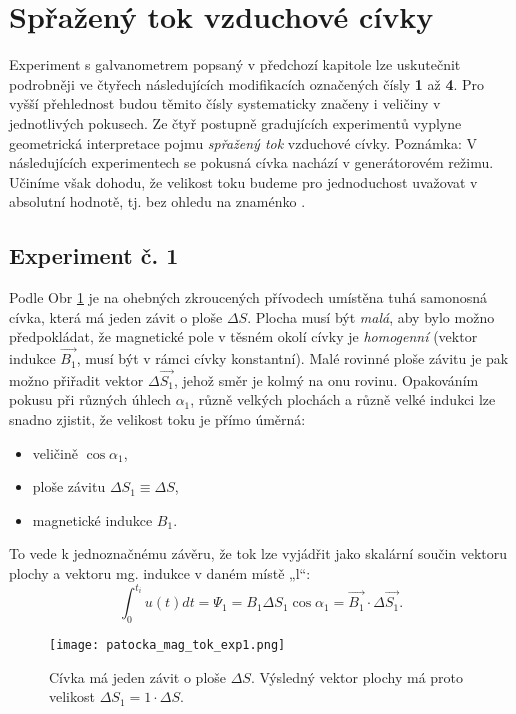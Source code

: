     \section{Spřažený tok vzduchové cívky}\label{ES:sec02}
      Experiment s galvanometrem popsaný v předchozí kapitole lze uskutečnit podrobněji ve čtyřech
      následujících modifikacích označených čísly \textbf{1} až \textbf{4}. Pro vyšší přehlednost
      budou těmito čísly systematicky značeny i veličiny v jednotlivých pokusech. Ze čtyř postupně
      gradujících experimentů vyplyne geometrická interpretace pojmu \emph{spřažený tok} vzduchové
      cívky. Poznámka: V následujících experimentech se pokusná  cívka nachází v generátorovém
      režimu. Učiníme však dohodu, že velikost toku budeme pro jednoduchost uvažovat v absolutní
      hodnotě, tj. bez ohledu na znaménko \cite[s.~12]{Patocka4}.

      \subsection{Experiment č. 1}
        Podle Obr \ref{es:fig_patocka_mag_tok_exp1} je na ohebných zkroucených přívodech umístěna 
        tuhá samonosná cívka, která má jeden závit o ploše \(\Delta S\). Plocha musí být 
        \emph{malá}, aby bylo možno předpokládat, že magnetické pole v těsném okolí cívky je 
        \emph{homogenní} (vektor indukce \(\vec{B_1}\), musí být v rámci cívky konstantní). Malé 
        rovinné ploše závitu je pak možno přiřadit vektor \(\Delta\vec{S_1}\), jehož směr je kolmý 
        na onu rovinu. Opakováním pokusu při různých úhlech \(\alpha_1\), různě velkých plochách a 
        různě velké indukci lze snadno zjistit, že velikost toku je přímo úměrná:
        \begin{itemize}\addtolength{\itemsep}{-0.5\baselineskip}
          \item veličině \(\cos\alpha_1\),
          \item ploše závitu \(\Delta S_1 \equiv \Delta S\),
          \item magnetické indukce \(B_1\).
        \end{itemize}
        To vede k jednoznačnému závěru, že tok lze vyjádřit jako skalární součin vektoru plochy a
        vektoru mg. indukce v daném místě „l“:
        \begin{equation}\label{ES:eq_zakl_elm07}
          \int_0^{t_i} u(t)dt = \Psi_1 = B_1\Delta S_1\cos\alpha_1 = \vec{B_1}\cdot\Delta\vec{S_1}.
        \end{equation}  
        \begin{figure}[ht!]
          \centering
          \texttt{[image: patocka\_mag\_tok\_exp1.png]}
          \caption{Cívka má jeden závit o ploše \(\Delta S\). Výsledný vektor plochy má proto 
                   velikost \(\Delta S_1 = 1\cdot\Delta S\). \cite[s.~13]{Patocka4}}
          \label{es:fig_patocka_mag_tok_exp1}
        \end{figure} 
      
